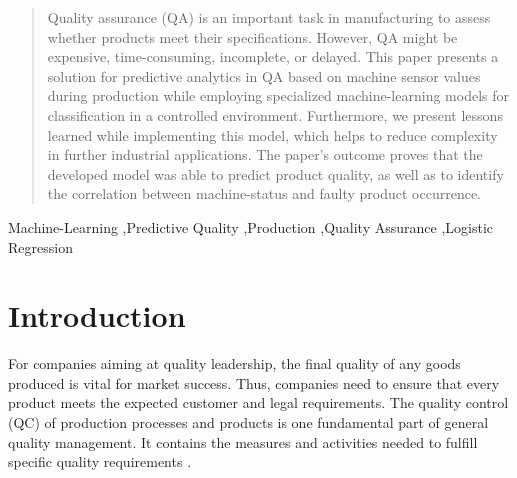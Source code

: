 \documentclass[5p,times,procedia]{elsarticle}
\begin{document}
\begin{frontmatter}
\begin{abstract}
Quality assurance (QA) is an important task in manufacturing to assess whether products 
meet their specifications. However, QA might be expensive, time-consuming, incomplete, or delayed.
This paper presents a solution for predictive analytics in QA based on machine sensor values during
production while employing specialized machine-learning models for classification in a controlled environment. 
Furthermore, we present lessons learned while implementing this model, which helps to reduce complexity in
further industrial applications. The paper’s outcome proves that the developed model was able to predict
product quality, as well as to identify the correlation between machine-status and faulty product occurrence.
\end{abstract}

\begin{keyword}
Machine-Learning \sep Predictive Quality \sep Production \sep Quality Assurance \sep Logistic Regression 




\end{keyword}

\end{frontmatter}


\section{Introduction} %

For companies aiming at quality leadership, the final quality of any goods produced is vital for market success. Thus, companies need to ensure that every product meets the expected customer and legal requirements.
The quality control (QC) of production processes and products is one fundamental part of general quality management. It contains the measures and activities needed to fulfill specific quality requirements \cite{mitra2016fundamentals}.
\end{document}

